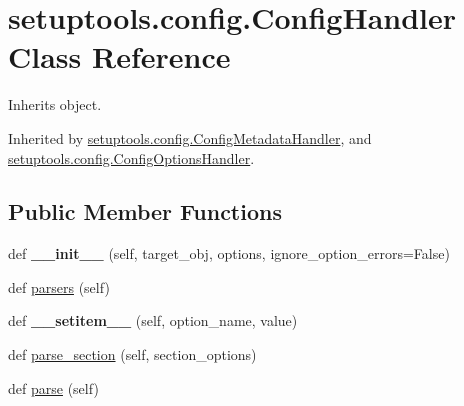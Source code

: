 \hypertarget{classsetuptools_1_1config_1_1_config_handler}{}\section{setuptools.\+config.\+Config\+Handler Class Reference}
\label{classsetuptools_1_1config_1_1_config_handler}


Inherits object.



Inherited by \hyperlink{classsetuptools_1_1config_1_1_config_metadata_handler}{setuptools.\+config.\+Config\+Metadata\+Handler}, and \hyperlink{classsetuptools_1_1config_1_1_config_options_handler}{setuptools.\+config.\+Config\+Options\+Handler}.

\subsection*{Public Member Functions}
\begin{DoxyCompactItemize}
\item 
\mbox{\label{classsetuptools_1_1config_1_1_config_handler_a00d3fc6e1c42f5e46490a423b4d124b6}} 
def {\bfseries \+\_\+\+\_\+init\+\_\+\+\_\+} (self, target\+\_\+obj, options, ignore\+\_\+option\+\_\+errors=False)
\item 
def \hyperlink{classsetuptools_1_1config_1_1_config_handler_aae6195fe85e3caf2da8bf0b41644e234}{parsers} (self)
\item 
\mbox{\label{classsetuptools_1_1config_1_1_config_handler_a972a9b2d1f6a6782ad900b58a63092d5}} 
def {\bfseries \+\_\+\+\_\+setitem\+\_\+\+\_\+} (self, option\+\_\+name, value)
\item 
def \hyperlink{classsetuptools_1_1config_1_1_config_handler_a253ac8a3585f40218d2e09d3243ade5b}{parse\+\_\+section} (self, section\+\_\+options)
\item 
def \hyperlink{classsetuptools_1_1config_1_1_config_handler_afdcabf01520d6e9a99ebf893b8422f17}{parse} (self)
\end{DoxyCompactItemize}
